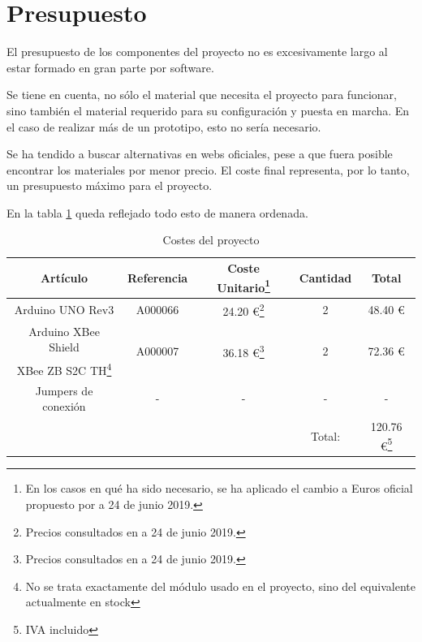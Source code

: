 \section{Presupuesto}

El presupuesto de los componentes del proyecto no es excesivamente largo al estar formado en gran parte por software.

Se tiene en cuenta, no sólo el material que necesita el proyecto para funcionar, sino también el material requerido para su configuración y puesta en marcha. En el caso de realizar más de un prototipo, esto no sería necesario.

Se ha tendido a buscar alternativas en webs oficiales, pese a que fuera posible encontrar los materiales por menor precio. El coste final representa, por lo tanto, un presupuesto máximo para el proyecto.

En la tabla \ref{tab:presupuesto} queda reflejado todo esto de manera ordenada.

\begin{table}[H]
\begin{center}
\begin{minipage}{\textwidth}
\begin{tabular}{|c|c|c|c|c|}
\hline
\textbf{Artículo} & \textbf{Referencia} & \textbf{Coste Unitario}\footnote{En los casos en qué ha sido necesario, se ha aplicado el cambio a Euros oficial propuesto por \cite{bancoEspana} a 24 de junio 2019.} & \textbf{Cantidad} & \textbf{Total} \\
\hline
\hline
Arduino UNO Rev3 & A000066 & 24.20 \euro\footnote{Precios consultados en \cite{arduinoStore} a 24 de junio 2019.} & 2 & 48.40 \euro\\
\hline
Arduino XBee Shield & \multirow{2}{*}{A000007} & \multirow{2}{*}{36.18 \euro\footnote{Precios consultados en \cite{arduinoStore} a 24 de junio 2019.}} & \multirow{2}{*}{2} & \multirow{2}{*}{72.36 \euro}\\
\cline{1-1}
XBee ZB S2C TH\footnote{No se trata exactamente del módulo usado en el proyecto, sino del equivalente actualmente en stock} & & & & \\
\hline
Jumpers de conexión &  - & -  & - & - \\
\hline
& & & Total: & 120.76 \euro\footnote{IVA incluido} \\
\hline
\end{tabular}
\end{minipage}
\end{center}
\caption{Costes del proyecto}
\label{tab:presupuesto}
\end{table}



